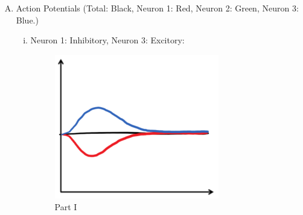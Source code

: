 \documentclass{article}
\begin{document}
\begin{enumerate}[A.]
    \item Action Potentials (Total: Black, Neuron 1: Red, Neuron 2: Green, Neuron 3: Blue.)
        \begin{enumerate}[i.]
            \item Neuron 1: Inhibitory, Neuron 3: Excitory:
                \begin{figure}[H]
                    \centering
                    \includegraphics[scale=1.00]{"Part I"}
                    \caption{Part I}
                \end{figure}


\end{enumerate}
\end{enumerate}
\end{document}
